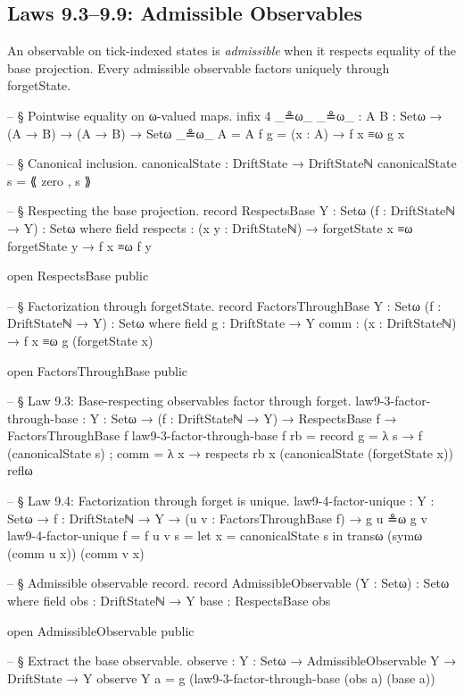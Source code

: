 \documentclass[11pt,a4paper]{book}
\def\texttt#1{#1}%
\begin{document}
\subsection{Laws 9.3--9.9: Admissible Observables}

An observable on tick-indexed states is \emph{admissible} when it respects equality of the base projection. Every admissible observable factors uniquely through \texttt{forgetState}.

\begin{code}
-- § Pointwise equality on ω-valued maps.
infix 4 _≗ω_
_≗ω_ : {A B : Setω} → (A → B) → (A → B) → Setω
_≗ω_ {A = A} f g = (x : A) → f x ≡ω g x

-- § Canonical inclusion.
canonicalState : DriftState → DriftStateℕ
canonicalState s = ⟪ zero , s ⟫

-- § Respecting the base projection.
record RespectsBase {Y : Setω} (f : DriftStateℕ → Y) : Setω where
  field
    respects : (x y : DriftStateℕ) → forgetState x ≡ω forgetState y → f x ≡ω f y

open RespectsBase public

-- § Factorization through forgetState.
record FactorsThroughBase {Y : Setω} (f : DriftStateℕ → Y) : Setω where
  field
    g    : DriftState → Y
    comm : (x : DriftStateℕ) → f x ≡ω g (forgetState x)

open FactorsThroughBase public

-- § Law 9.3: Base-respecting observables factor through forget.
law9-3-factor-through-base :
  {Y : Setω} →
  (f : DriftStateℕ → Y) →
  RespectsBase f →
  FactorsThroughBase f
law9-3-factor-through-base f rb = record
  { g = λ s → f (canonicalState s)
  ; comm = λ x →
      respects rb x (canonicalState (forgetState x)) reflω
  }

-- § Law 9.4: Factorization through forget is unique.
law9-4-factor-unique :
  {Y : Setω} →
  {f : DriftStateℕ → Y} →
  (u v : FactorsThroughBase f) →
  g u ≗ω g v
law9-4-factor-unique {f = f} u v s =
  let
    x = canonicalState s
  in
  transω (symω (comm u x)) (comm v x)

-- § Admissible observable record.
record AdmissibleObservable (Y : Setω) : Setω where
  field
    obs  : DriftStateℕ → Y
    base : RespectsBase obs

open AdmissibleObservable public

-- § Extract the base observable.
observe : {Y : Setω} → AdmissibleObservable Y → DriftState → Y
observe {Y} a = g (law9-3-factor-through-base (obs a) (base a))


\end{code}
\end{document}
